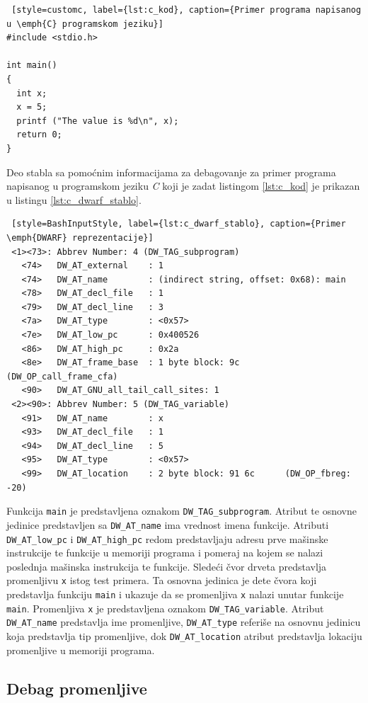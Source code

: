 \documentclass[12pt,oneside]{memoir}
\begin{document}
\begin{lstlisting} [style=customc, label={lst:c_kod}, caption={Primer programa napisanog u \emph{C} programskom jeziku}]
#include <stdio.h>

int main()
{
  int x;
  x = 5;
  printf ("The value is %d\n", x);
  return 0;
}
\end{lstlisting}

Deo stabla sa pomoćnim informacijama za debagovanje za primer programa napisanog u programskom jeziku \emph{C} koji je zadat listingom \ref{lst:c_kod} je prikazan u listingu \ref{lst:c_dwarf_stablo}.
\begin{lstlisting} [style=BashInputStyle, label={lst:c_dwarf_stablo}, caption={Primer \emph{DWARF} reprezentacije}]
 <1><73>: Abbrev Number: 4 (DW_TAG_subprogram)
   <74>   DW_AT_external    : 1
   <74>   DW_AT_name        : (indirect string, offset: 0x68): main
   <78>   DW_AT_decl_file   : 1
   <79>   DW_AT_decl_line   : 3
   <7a>   DW_AT_type        : <0x57>
   <7e>   DW_AT_low_pc      : 0x400526
   <86>   DW_AT_high_pc     : 0x2a
   <8e>   DW_AT_frame_base  : 1 byte block: 9c         (DW_OP_call_frame_cfa)
   <90>   DW_AT_GNU_all_tail_call_sites: 1
 <2><90>: Abbrev Number: 5 (DW_TAG_variable)
   <91>   DW_AT_name        : x
   <93>   DW_AT_decl_file   : 1
   <94>   DW_AT_decl_line   : 5
   <95>   DW_AT_type        : <0x57>
   <99>   DW_AT_location    : 2 byte block: 91 6c      (DW_OP_fbreg: -20)
\end{lstlisting}

Funkcija \texttt{main} je predstavljena oznakom \texttt{DW\_TAG\_subprogram}. Atribut te osnovne jedinice predstavljen sa \texttt{DW\_AT\_name} ima vrednost imena funkcije. Atributi \texttt{DW\_AT\_low\_pc} i \texttt{DW\_AT\_high\_pc} redom predstavljaju adresu prve mašinske instrukcije te funkcije u memoriji programa i pomeraj na kojem se nalazi poslednja mašinska instrukcija te funkcije. Sledeći čvor drveta predstavlja promenljivu \texttt{x} istog test primera. Ta osnovna jedinica je dete čvora koji predstavlja funkciju \texttt{main} i ukazuje da se promenljiva \texttt{x} nalazi unutar funkcije \texttt{main}. Promenljiva \texttt{x} je predstavljena oznakom \texttt{DW\_TAG\_variable}. Atribut \texttt{DW\_AT\_name} predstavlja ime promenljive, \texttt{DW\_AT\_type} referiše na osnovnu jedinicu koja predstavlja tip promenljive, dok \texttt{DW\_AT\_location} atribut predstavlja lokaciju promenljive u memoriji programa. 

\subsection{Debag promenljive}
\end{document}
